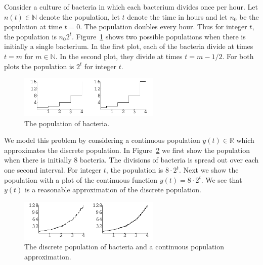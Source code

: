 \begin{Example}
  Consider a culture of bacteria in which each bacterium divides 
  once per hour.  Let $n(t) \in \mathbb{N}$ denote the 
  population, let $t$ denote the time in hours and let $n_0$ be the 
  population at time $t = 0$.  The population doubles every hour.  Thus 
  for integer $t$, the population is $n_0 2^t$.  Figure~\ref{figure bacteria1}
  shows two possible populations when there is initially a single 
  bacterium.  In the first plot, each of the bacteria divide at times
  $t = m$ for $m \in \mathbb{N}$.  In the second plot, they divide at 
  times $t = m - 1/2$.  For both plots the population is $2^t$ for 
  integer $t$.

  \begin{figure}[tb!]
    \begin{center}
      \includegraphics[width=0.6\textwidth]{ode/introduction/bacteria1}
    \end{center}
    \caption{The population of bacteria.}
    \label{figure bacteria1}
  \end{figure}

  We model this problem by considering a continuous population 
  $y(t) \in \mathbb{R}$ which approximates the discrete population.
  In Figure~\ref{figure bacteria8} we first show the population
  when there is initially 8 bacteria.  The divisions of bacteria is 
  spread out over each one second interval.   For integer $t$, the 
  population is $8 \cdot 2^t$.  Next we show the population with a plot of 
  the continuous function $y(t) = 8 \cdot 2^t$.  We see that $y(t)$ is a 
  reasonable approximation of the discrete population.  
  
  \begin{figure}[tb!]
    \begin{center}
      \includegraphics[width=0.6\textwidth]{ode/introduction/bacteria8}
    \end{center}
    \caption{The discrete population of bacteria and a continuous 
      population approximation.}
    \label{figure bacteria8}
  \end{figure}


\end{Example}
